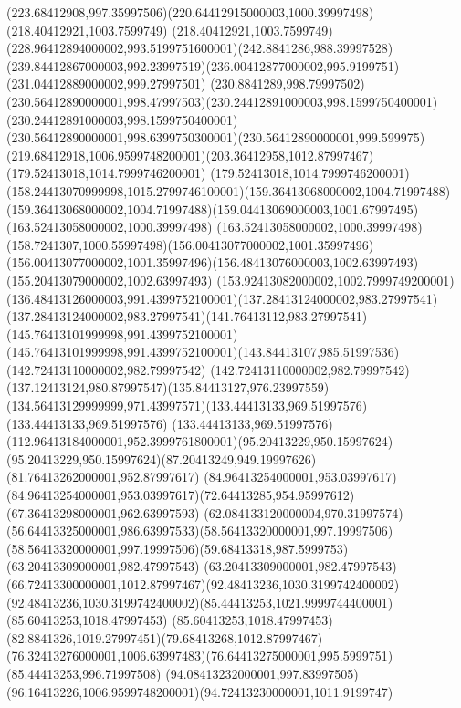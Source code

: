 {{	\curveto(223.68412908,997.35997506)(220.64412915000003,1000.39997498)(218.40412921,1003.7599749)
	\curveto(218.40412921,1003.7599749)(228.96412894000002,993.5199751600001)(242.8841286,988.39997528)
	\curveto(239.84412867000003,992.23997519)(236.00412877000002,995.9199751)(231.04412889000002,999.27997501)
	\curveto(230.8841289,998.79997502)(230.56412890000001,998.47997503)(230.24412891000003,998.1599750400001)
	\curveto(230.24412891000003,998.1599750400001)(230.56412890000001,998.6399750300001)(230.56412890000001,999.599975)
	\curveto(219.68412918,1006.9599748200001)(203.36412958,1012.87997467)(179.52413018,1014.7999746200001)
	\curveto(179.52413018,1014.7999746200001)(158.24413070999998,1015.2799746100001)(159.36413068000002,1004.71997488)
	\curveto(159.36413068000002,1004.71997488)(159.04413069000003,1001.67997495)(163.52413058000002,1000.39997498)
	\curveto(163.52413058000002,1000.39997498)(158.7241307,1000.55997498)(156.00413077000002,1001.35997496)
	\curveto(156.00413077000002,1001.35997496)(156.48413076000003,1002.63997493)(155.20413079000002,1002.63997493)
	\curveto(153.92413082000002,1002.7999749200001)(136.48413126000003,991.4399752100001)(137.28413124000002,983.27997541)
	\curveto(137.28413124000002,983.27997541)(141.76413112,983.27997541)(145.76413101999998,991.4399752100001)
	\curveto(145.76413101999998,991.4399752100001)(143.84413107,985.51997536)(142.72413110000002,982.79997542)
	\curveto(142.72413110000002,982.79997542)(137.12413124,980.87997547)(135.84413127,976.23997559)
	\curveto(134.56413129999999,971.43997571)(133.44413133,969.51997576)(133.44413133,969.51997576)
	\curveto(133.44413133,969.51997576)(112.96413184000001,952.3999761800001)(95.20413229,950.15997624)
	\curveto(95.20413229,950.15997624)(87.20413249,949.19997626)(81.76413262000001,952.87997617)
	\lineto(84.96413254000001,953.03997617)
	\curveto(84.96413254000001,953.03997617)(72.64413285,954.95997612)(67.36413298000001,962.63997593)
	\curveto(62.084133120000004,970.31997574)(56.64413325000001,986.63997533)(58.56413320000001,997.19997506)
	\curveto(58.56413320000001,997.19997506)(59.68413318,987.5999753)(63.20413309000001,982.47997543)
	\curveto(63.20413309000001,982.47997543)(66.72413300000001,1012.87997467)(92.48413236,1030.3199742400002)
	\curveto(92.48413236,1030.3199742400002)(85.44413253,1021.9999744400001)(85.60413253,1018.47997453)
	\curveto(85.60413253,1018.47997453)(82.8841326,1019.27997451)(79.68413268,1012.87997467)
	\curveto(76.32413276000001,1006.63997483)(76.64413275000001,995.5999751)(85.44413253,996.71997508)
	\curveto(94.08413232000001,997.83997505)(96.16413226,1006.9599748200001)(94.72413230000001,1011.9199747)
}}
